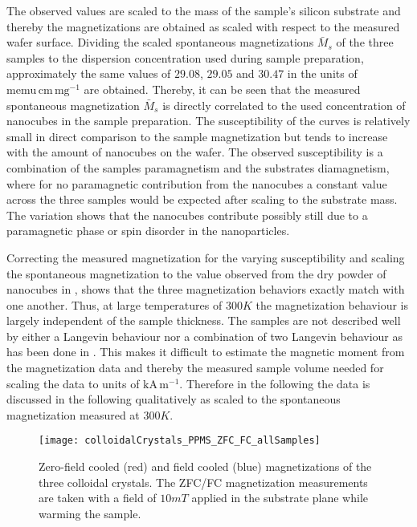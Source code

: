 \documentclass[\main/dresen_thesis.tex]{subfiles}
\begin{document}
    The observed values are scaled to the mass of the sample's silicon substrate and thereby the magnetizations are obtained as scaled with respect to the measured wafer surface.
    Dividing the scaled spontaneous magnetizations $\bar{M}_s$ of the three samples to the dispersion concentration used during sample preparation, approximately the same values of $29.08$, $29.05$ and $30.47$ in the units of $\mathrm{memu \, cm \, mg^{-1}}$ are obtained.
    Thereby, it can be seen that the measured spontaneous magnetization $\bar{M}_s$ is directly correlated to the used concentration of nanocubes in the sample preparation.
    The susceptibility of the curves is relatively small in direct comparison to the sample magnetization but tends to increase with the amount of nanocubes on the wafer.
    The observed susceptibility is a combination of the samples paramagnetism and the substrates diamagnetism, where for no paramagnetic contribution from the nanocubes a constant value across the three samples would be expected after scaling to the substrate mass.
    The variation shows that the nanocubes contribute possibly still due to a paramagnetic phase or spin disorder in the nanoparticles.

    Correcting the measured magnetization for the varying susceptibility and scaling the spontaneous magnetization to the value observed from the dry powder of nanocubes in ,  shows that the three magnetization behaviors exactly match with one another.
    Thus, at large temperatures of $300 \unit{K}$ the magnetization behaviour is largely independent of the sample thickness.
    The samples are not described well by either a Langevin behaviour nor a combination of two Langevin behaviour as has been done in .
    This makes it difficult to estimate the magnetic moment from the magnetization data and thereby the measured sample volume needed for scaling the data to units of $\mathrm{kA \, m^{-1}}$.
    Therefore in the following the data is discussed in the following qualitatively as scaled to the spontaneous magnetization measured at $300 \unit{K}$.

    \begin{figure}[tb]
      \centering
      \texttt{[image: colloidalCrystals\_PPMS\_ZFC\_FC\_allSamples]}
      \caption{\label{fig:colloidalCrystals:zfcFCData}Zero-field cooled (red) and field cooled (blue) magnetizations of the three colloidal crystals. The ZFC/FC magnetization measurements are taken with a field of $10 \unit{mT}$ applied in the substrate plane while warming the sample.}
    \end{figure}
\end{document}
